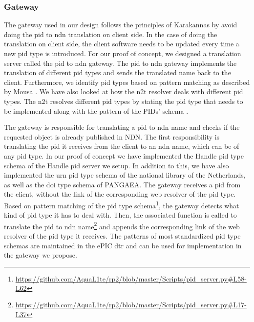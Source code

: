 \subsubsection{Gateway}\label{gw}
The gateway used in our design follows the principles of Karakannas by avoid doing the \gls{pid} to \gls{ndn} translation on client side. In the case of doing the translation on client side, the client software needs to be updated every time a new \gls{pid} type is introduced. For our proof of concept, we designed a translation server called the \gls{pid} to \gls{ndn} gateway. The \gls{pid} to \gls{ndn} gateway implements the translation of different \gls{pid} types and sends the translated name back to the client. Furthermore, we identify \gls{pid} types based on pattern matching as described by Mousa \cite{ndn-app-aware}. We have also looked at how the \gls{n2t} resolver deals with different \gls{pid} types. The \gls{n2t} resolves different \gls{pid} types by stating the \gls{pid} type that needs to be implemented along with the pattern of the PIDs' schema \cite{n2t}.

The gateway is responsible for translating a \gls{pid} to \gls{ndn} name and checks if the requested object is already published in NDN. 
The first responsibility is translating the \gls{pid} it receives from the client to an \gls{ndn} name, which can be of any \gls{pid} type. In our proof of concept we have implemented the Handle \gls{pid} type schema of the Handle \gls{pid} server we setup. In addition to this, we have also implemented the \gls{urn} \gls{pid} type schema of the national library of the Netherlands, as well as the \gls{doi} type schema of PANGAEA. The gateway receives a \gls{pid} from the client, without the link of the corresponding web resolver of the \gls{pid} type. Based on pattern matching of the \gls{pid} type schema\footnote{\url{https://github.com/AquaL1te/rp2/blob/master/Scripts/pid_server.py\#L58-L62}}, the gateway detects what kind of \gls{pid} type it has to deal with. Then, the associated function is called to translate the \gls{pid} to \gls{ndn} name\footnote{\url{https://github.com/AquaL1te/rp2/blob/master/Scripts/pid_server.py\#L17-L37}} and appends the corresponding link of the web resolver of the \gls{pid} type it receives. 
The patterns of most standardized \gls{pid} type schemas are maintained in the ePIC \gls{dtr} \cite{dtr} and can be used for implementation in the gateway we propose. 

